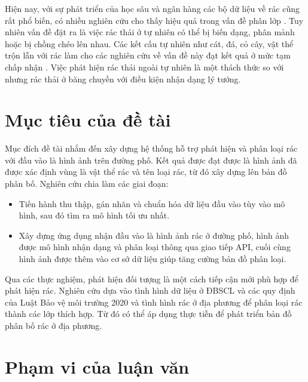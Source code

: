 \documentclass[../the.tex]{subfiles}
\begin{document}
{\fontsize{13}{12} \selectfont 
Hiện nay, với sự phát triển của học sâu và ngân hàng các bộ dữ liệu về rác cũng rất phổ biến, có nhiều nghiên cứu cho thấy hiệu quả trong vấn đề phân lớp \cite{yang2016classification} \cite{shah2022method} \cite{ahmad2020intelligent}. 
Tuy nhiên vấn đề đặt ra là việc rác thải ở tự nhiên có thể bị biến dạng, phân mảnh hoặc bị chồng chéo lên nhau.
Các kết cấu tự nhiên như cát, đá, cỏ cây, vật thể trộn lẫn với rác làm cho các nghiên cứu về vấn đề này đạt kết quả ở mức tạm chấp nhận \cite{Majchrowska_2022} \cite{9122693} \cite{8793975} \cite{proença2020taco}.
Việc phát hiện rác thải ngoài tự nhiên là một thách thức so với nhưng rác thải ở băng chuyền với điều kiện nhận dạng lý tưởng.

}


\section{Mục tiêu của đề tài}
\label{muc_tieu}


{\fontsize{13}{12} \selectfont
Mục đích đề tài nhắm đến xây dựng hệ thống hỗ trợ phát hiện và phân loại rác với đầu vào là hình ảnh trên đường phố. Kết quả được đạt được là hình ảnh đã được xác định vùng là vật thể rác và tên loại rác, từ đó xây dựng lên bản đồ phân bố. Nghiên cứu chia làm các giai đoạn:
\begin{itemize}
  \item Tiến hành thu thập, gán nhãn và chuẩn hóa dữ liệu đầu vào tùy vào mô hình, sau đó tìm ra mô hình tối ưu nhất.
  
  \item Xây dựng ứng dụng nhận đầu vào là hình ảnh rác ở đường phố, hình ảnh được mô hình nhận dạng và phân loại thông qua giao tiếp API, cuối cùng hình ảnh được thêm vào cơ sở dữ liệu giúp tăng cường bản đồ phân loại.
 
\end{itemize}
}
\bigskip

{\fontsize{13}{12} \selectfont
Qua các thực nghiệm, phát hiện đối tượng là một cách tiếp cận mới phù hợp để phát hiện rác. Nghiên cứu dựa vào tình hình dữ liệu ở ĐBSCL và các quy định của Luật Bảo vệ môi trường 2020 và tình hình rác ở địa phương để phân loại rác thành các lớp thích hợp. Từ đó có thể áp dụng thực tiễn để phát triển bản đồ phân bố rác ở địa phương. }


\section{Phạm vi của luận văn}
\label{pham_vi}
\end{document}
